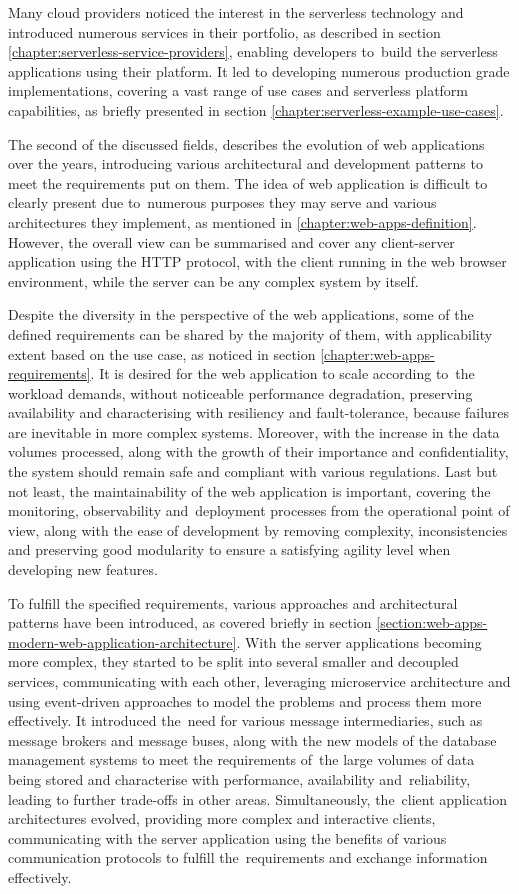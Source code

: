 Many cloud providers noticed the interest in the serverless technology and introduced numerous services in their portfolio, as described in section \ref{chapter:serverless-service-providers}, enabling developers to~build the serverless applications using their platform.
It led to developing numerous production grade implementations, covering a vast range of use cases and serverless platform capabilities, as briefly presented in section \ref{chapter:serverless-example-use-cases}.

The second of the discussed fields, describes the evolution of web applications over the years, introducing various architectural and development patterns to meet the requirements put on them.
The idea of web application is difficult to clearly present due to~numerous purposes they may serve and various architectures they implement, as mentioned in \ref{chapter:web-apps-definition}. However, the overall view can be summarised and cover any client-server application using the HTTP protocol, with the client running in the web browser environment, while the server can be any complex system by itself.

Despite the diversity in the perspective of the web applications, some of the defined requirements can be shared by the majority of them, with applicability extent based on the use case, as noticed in section \ref{chapter:web-apps-requirements}.
It is desired for the web application to scale according to~the workload demands, without noticeable performance degradation, preserving availability and characterising with resiliency and fault-tolerance, because failures are inevitable in more complex systems. Moreover, with the increase in the data volumes processed, along with the growth of their importance and confidentiality, the system should remain safe and compliant with various regulations. Last but not least, the maintainability of the web application is important, covering the monitoring, observability and~deployment processes from the operational point of view, along with the ease of development by removing complexity, inconsistencies and preserving good modularity to ensure a satisfying agility level when developing new features.

To fulfill the specified requirements, various approaches and architectural patterns have been introduced, as covered briefly in section \ref{section:web-apps-modern-web-application-architecture}.
With the server applications becoming more complex, they started to be split into several smaller and decoupled services, communicating with each other, leveraging microservice architecture and using event-driven approaches to model the problems and process them more effectively.
It introduced the~need for various message intermediaries, such as message brokers and message buses, along with the new models of the database management systems to meet the requirements of~the large volumes of data being stored and characterise with performance, availability and~reliability, leading to further trade-offs in other areas.
Simultaneously, the~client application architectures evolved, providing more complex and interactive clients, communicating with the server application using the benefits of various communication protocols to fulfill the~requirements and exchange information effectively.

